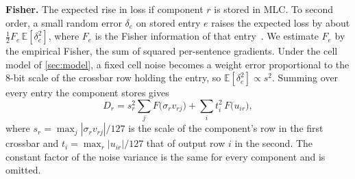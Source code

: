 \textbf{Fisher.} The expected rise in loss if component $r$ is stored in MLC. To second order, a small
random error $\delta_e$ on stored entry $e$ raises the expected loss by about $\tfrac12F_e\,\mathbb
E[\delta_e^2]$, where $F_e$ is the Fisher information of that entry~\cite{lecun1990obd}. We estimate $F_e$
by the empirical Fisher, the sum of squared per-sentence gradients. Under the cell model of
\cref{sec:model}, a fixed cell noise becomes a weight error proportional to the 8-bit scale of the
crossbar row holding the entry, so $\mathbb E[\delta_e^2]\propto s^2$. Summing over every entry the
component stores gives
\begin{equation}
D_r=s_r^2\sum_j F\big(\sigma_r v_{rj}\big)+\sum_i t_i^2\,F\big(u_{ir}\big),
\label{eq:fisher}
\end{equation}
where $s_r=\max_j|\sigma_r v_{rj}|/127$ is the scale of the component's row in the first crossbar and
$t_i=\max_r|u_{ir}|/127$ that of output row $i$ in the second. The constant factor of the noise variance
is the same for every component and is omitted.
